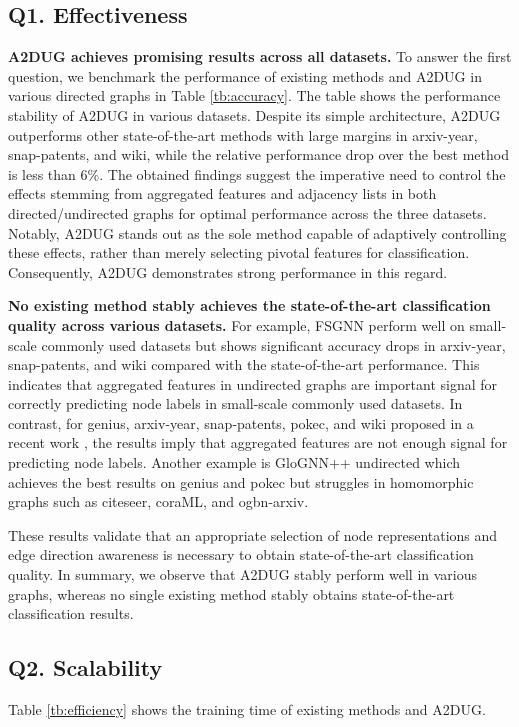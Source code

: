 \subsection{Q1. Effectiveness}
\label{ssec:effectiveness}

\smallskip \noindent \textbf{A2DUG achieves promising results across all datasets. } 
To answer the first question, we benchmark the performance of existing methods and A2DUG in various directed graphs in Table \ref{tb:accuracy}. 
The table shows the performance stability of A2DUG in various datasets. 
Despite its simple architecture, \textsc{A2DUG} outperforms other state-of-the-art methods with large margins in arxiv-year, snap-patents, and wiki, while the relative performance drop over the best method is less than $6\%$. 
The obtained findings suggest the imperative need to control the effects stemming from aggregated features and adjacency lists in both directed/undirected graphs for optimal performance across the three datasets. 
Notably, A2DUG stands out as the sole method capable of adaptively controlling these effects, rather than merely selecting pivotal features for classification. 
Consequently, A2DUG demonstrates strong performance in this regard.

\noindent\textbf{No existing method stably achieves the state-of-the-art classification quality across various datasets. }
For example, FSGNN perform well on small-scale commonly used datasets but shows significant accuracy drops in arxiv-year, snap-patents, and wiki compared with the state-of-the-art performance. This indicates that aggregated features in undirected graphs are important signal for correctly predicting node labels in small-scale commonly used datasets. 
In contrast, for genius, arxiv-year, snap-patents, pokec, and wiki proposed in a recent work \cite{lim2021large}, the results imply that aggregated features are not enough signal for predicting node labels. 
Another example is GloGNN++ undirected which achieves the best results on genius and pokec but struggles in homomorphic graphs such as citeseer, coraML, and ogbn-arxiv. 


These results validate that an appropriate selection of node representations and edge direction awareness is necessary to obtain state-of-the-art classification quality.
In summary, we observe that A2DUG stably perform well in various graphs, whereas no single existing method stably obtains state-of-the-art classification results. 



\subsection{Q2. Scalability}
\label{ssec:performance_A2DUG}
Table \ref{tb:efficiency} shows the training time of existing methods and \textsc{A2DUG}. 

